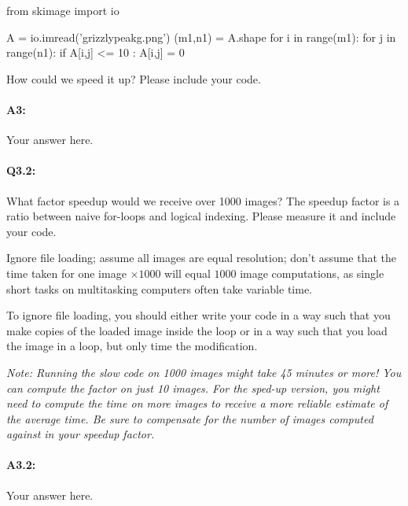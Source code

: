 \documentclass[11pt]{article}
\begin{document}
\begin{python}
from skimage import io

A = io.imread('grizzlypeakg.png')
(m1,n1) = A.shape
for i in range(m1):
    for j in range(n1):
        if A[i,j] <= 10 :
            A[i,j] = 0       
\end{python}

How could we speed it up? Please include your code. \\

\paragraph{A3:} Your answer here.




\pagebreak
\paragraph{Q3.2:} What factor speedup would we receive over 1000 images? The speedup factor is a ratio between naive for-loops and logical indexing. Please measure it and include your code.

Ignore file loading; assume all images are equal resolution; don't assume that the time taken for one image $\times1000$ will equal $1000$ image computations, as single short tasks on multitasking computers often take variable time.

To ignore file loading, you should either write your code in a way such that you make copies of the loaded image inside the loop or in a way such that you load the image in a loop, but only time the modification.

\emph{Note: Running the slow code on 1000 images might take 45 minutes or more! You can compute the factor on just 10 images. For the sped-up version, you might need to compute the time on more images to receive a more reliable estimate of the average time. Be sure to compensate for the number of images computed against in your speedup factor.}

\paragraph{A3.2:} Your answer here.



\end{document}
